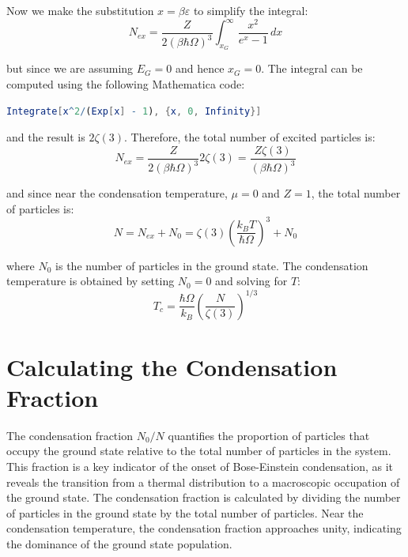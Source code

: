 \documentclass{article}
\numberwithin{equation}{section}
\numberwithin{equation}{subsection}
\begin{document}
Now we make the substitution \( x = \beta\varepsilon\) to simplify the integral:
$$N_{ex} = \frac{Z}{2(\beta\hbar\Omega)^3} \int_{x_G}^{\infty} \frac{x^2}{e^x - 1} \,dx
$$

but since we are assuming $E_G = 0$ and hence $x_G = 0$. The integral can be computed using the following Mathematica code:
\begin{lstlisting}[language=Mathematica]
    Integrate[x^2/(Exp[x] - 1), {x, 0, Infinity}]
\end{lstlisting}
and the result is $2\zeta(3)$. Therefore, the total number of excited particles is:
\begin{equation}
    N_{ex} = \frac{Z}{2(\beta\hbar\Omega)^3} 2\zeta(3) = \frac{Z\zeta(3)}{(\beta\hbar\Omega)^3}
\end{equation}

and since near the condensation temperature, $\mu = 0$ and $Z = 1$, the total number of particles is:
\begin{equation}
    N = N_{ex} + N_0 = \zeta(3) \left(\frac{k_BT}{\hbar\Omega}\right)^3  + N_0 
\end{equation}

where $N_0$ is the number of particles in the ground state. The condensation temperature is obtained by setting $N_0 = 0$ and solving for $T$:
\begin{equation}
    T_c = \frac{\hbar\Omega}{k_B}\left(\frac{N}{\zeta(3)}\right)^{1/3}
\end{equation}

\section{Calculating the Condensation Fraction}
The condensation fraction \( N_0/N \) quantifies the proportion of particles that occupy the ground state relative to the total number of particles in the system. This fraction is a key indicator of the onset of Bose-Einstein condensation, as it reveals the transition from a thermal distribution to a macroscopic occupation of the ground state. The condensation fraction is calculated by dividing the number of particles in the ground state by the total number of particles. Near the condensation temperature, the condensation fraction approaches unity, indicating the dominance of the ground state population.\\
\end{document}
